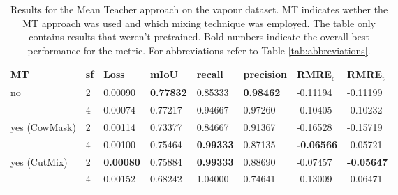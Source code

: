 \begin{table}[htbp]
    \centering
    \begin{tabular}{llllllll}
        \toprule
        MT            & sf & Loss             & mIoU             & recall           & precision        & RMRE$_\text{c}$   & RMRE$_\text{t}$   \\ \midrule
        no            & 2  & 0.00090          & \textbf{0.77832} & 0.85333          & \textbf{0.98462} & -0.11194          & -0.11199          \\
                      & 4  & 0.00074          & 0.77217          & 0.94667          & 0.97260          & -0.10405          & -0.10232          \\ \midrule
        yes (CowMask) & 2  & 0.00114          & 0.73377          & 0.84667          & 0.91367          & -0.16528          & -0.15719          \\
                      & 4  & 0.00100          & 0.75464          & \textbf{0.99333} & 0.87135          & \textbf{-0.06566} & -0.05721 \\ \midrule
        yes (CutMix)  & 2  & \textbf{0.00080} & 0.75884          & \textbf{0.99333} & 0.88690          & -0.07457          & \textbf{-0.05647}          \\
                      & 4  & 0.00152          & 0.68242          & 1.04000          & 0.74641          & -0.13009          & -0.06471          \\ \bottomrule
        \end{tabular}
    \vspace{0.2cm}
    \caption{Results for the Mean Teacher approach on the vapour dataset. MT indicates wether the MT approach was used and which mixing technique was employed. The table only contains results that weren't pretrained. Bold numbers indicate the overall best performance for the metric. For abbreviations refer to Table \ref{tab:abbreviations}.}
    \label{tab:vapour_results_mt}
\end{table}
